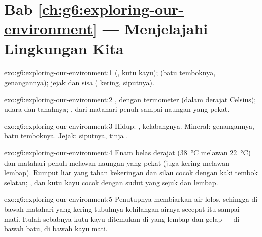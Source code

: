 \section*{Bab \ref{ch:g6:exploring-our-environment} --- Menjelajahi Lingkungan Kita}

\begin{solution}{exo:g6:exploring-our-environment:1}
 (, kutu kayu);  (batu temboknya,
genangannya); jejak dan sisa  ( kering, 
siputnya).
\end{solution}

\begin{solution}{exo:g6:exploring-our-environment:2}
, dengan termometer (dalam derajat Celsius);  udara dan
tanahnya; , dari matahari penuh sampai naungan yang pekat.
\end{solution}

\begin{solution}{exo:g6:exploring-our-environment:3}
Hidup: , kelabangnya. Mineral: genangannya, batu
temboknya. Jejak:  siputnya, tinja .
\end{solution}

\begin{solution}{exo:g6:exploring-our-environment:4}
Enam belas derajat (\qty{38}{\degreeCelsius} melawan
\qty{22}{\degreeCelsius}) dan matahari penuh melawan naungan yang
pekat (juga kering melawan lembap). Rumput liar yang tahan kekeringan
dan silau cocok dengan kaki tembok selatan; ,  dan
kutu kayu cocok dengan sudut yang sejuk dan lembap.
\end{solution}

\begin{solution}{exo:g6:exploring-our-environment:5}
Penutupnya membiarkan air lolos, sehingga di bawah matahari yang
kering tubuhnya kehilangan airnya secepat itu sampai mati. Itulah
sebabnya kutu kayu ditemukan di  yang lembap dan gelap ---
di bawah batu, di bawah kayu mati.
\end{solution}


